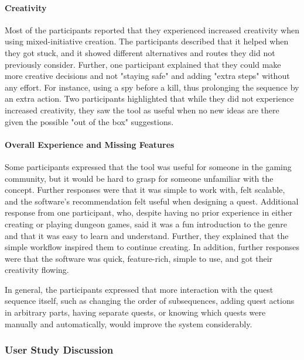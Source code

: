 \paragraph{Creativity}

Most of the participants reported that they experienced increased creativity when using mixed-initiative creation. The participants described that it helped when they got stuck, and it showed different alternatives and routes they did not previously consider. Further, one participant explained that they could make more creative decisions and not "staying safe" and adding "extra steps" without any effort. For instance, using a spy before a kill, thus prolonging the sequence by an extra action. Two participants highlighted that while they did not experience increased creativity, they saw the tool as useful when no new ideas are there given the possible "out of the box" suggestions.

\paragraph{Overall Experience and Missing Features}

Some participants expressed that the tool was useful for someone in the gaming community, but it would be hard to grasp for someone unfamiliar with the concept. Further responses were that it was simple to work with, felt scalable, and the software's recommendation felt useful when designing a quest. Additional response from one participant, who, despite having no prior experience in either creating or playing dungeon games, said it was a fun introduction to the genre and that it was easy to learn and understand. Further, they explained that the simple workflow inspired them to continue creating. In addition, further responses were that the software was quick, feature-rich, simple to use, and got their creativity flowing.

In general, the participants expressed that more interaction with the quest sequence itself, such as changing the order of subsequences, adding quest actions in arbitrary parts, having separate quests, or knowing which quests were manually and automatically, would improve the system considerably. 

\subsubsection{User Study Discussion}

